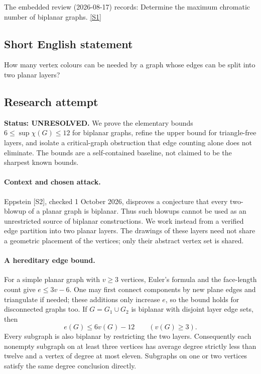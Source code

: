 \documentclass[11pt,a4paper]{article}
\newcommand{\sref}[2]{\hyperlink{source:#1:#2}{[S#2]}}
\begin{document}
The embedded review (2026-08-17) records: Determine the maximum chromatic number of biplanar graphs. \sref{statement}{1}

\subsection{Short English statement}

How many vertex colours can be needed by a graph whose edges can be split into two planar layers?

\subsection{Research attempt}
\textbf{Status: UNRESOLVED.} We prove the elementary bounds $6\le\sup\chi(G)\le12$ for biplanar graphs, refine the upper bound for triangle-free layers, and isolate a critical-graph obstruction that edge counting alone does not eliminate. The bounds are a self-contained baseline, not claimed to be the sharpest known bounds.

\paragraph{Context and chosen attack.}
Eppstein [S2], checked 1 October 2026, disproves a conjecture that every two-blowup of a planar graph is biplanar. Thus such blowups cannot be used as an unrestricted source of biplanar constructions. We work instead from a verified edge partition into two planar layers. The drawings of these layers need not share a geometric placement of the vertices; only their abstract vertex set is shared.

\paragraph{A hereditary edge bound.}
For a simple planar graph with $v\ge3$ vertices, Euler's formula and the face-length count give $e\le3v-6$. One may first connect components by new plane edges and triangulate if needed; these additions only increase $e$, so the bound holds for disconnected graphs too. If $G=G_1\cup G_2$ is biplanar with disjoint layer edge sets, then
\[
e(G)\le6v(G)-12\qquad(v(G)\ge3).
\]
Every subgraph is also biplanar by restricting the two layers. Consequently each nonempty subgraph on at least three vertices has average degree strictly less than twelve and a vertex of degree at most eleven. Subgraphs on one or two vertices satisfy the same degree conclusion directly.
\end{document}
